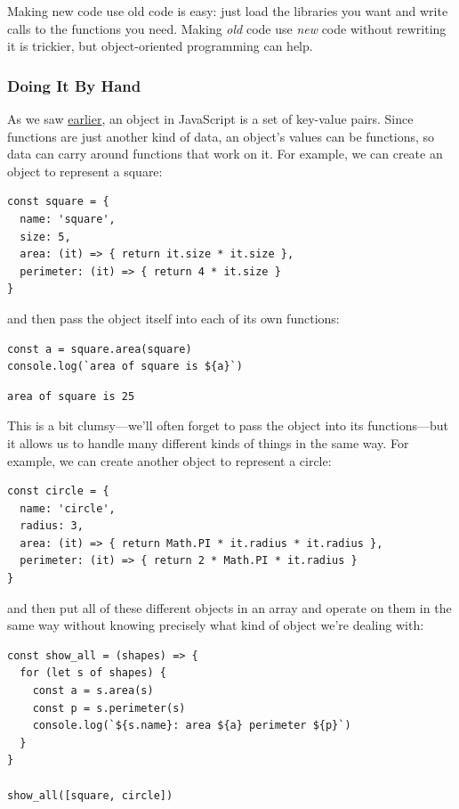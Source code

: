 Making new code use old code is easy: just load the libraries you want
and write calls to the functions you need. Making \emph{old} code use
\emph{new} code without rewriting it is trickier, but object-oriented
programming can help.

\subsubsection{Doing It By Hand}\label{s:oop-manual}

As we saw \protect\hyperlink{s:basics}{earlier}, an object in JavaScript
is a set of key-value pairs. Since functions are just another kind of
data, an object's values can be functions, so data can carry around
functions that work on it. For example, we can create an object to
represent a square:

\begin{verbatim}
const square = {
  name: 'square',
  size: 5,
  area: (it) => { return it.size * it.size },
  perimeter: (it) => { return 4 * it.size }
}
\end{verbatim}

and then pass the object itself into each of its own functions:

\begin{verbatim}
const a = square.area(square)
console.log(`area of square is ${a}`)
\end{verbatim}

\begin{verbatim}
area of square is 25
\end{verbatim}

This is a bit clumsy---we'll often forget to pass the object into its
functions---but it allows us to handle many different kinds of things in
the same way. For example, we can create another object to represent a
circle:

\begin{verbatim}
const circle = {
  name: 'circle',
  radius: 3,
  area: (it) => { return Math.PI * it.radius * it.radius },
  perimeter: (it) => { return 2 * Math.PI * it.radius }
}
\end{verbatim}

and then put all of these different objects in an array and operate on
them in the same way without knowing precisely what kind of object we're
dealing with:

\begin{verbatim}
const show_all = (shapes) => {
  for (let s of shapes) {
    const a = s.area(s)
    const p = s.perimeter(s)
    console.log(`${s.name}: area ${a} perimeter ${p}`)
  }
}

show_all([square, circle])
\end{verbatim}

